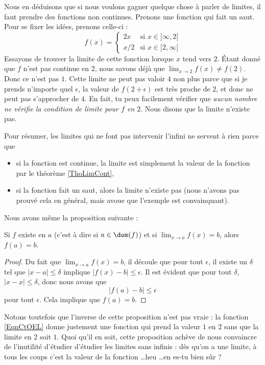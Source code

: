 Nous en déduisons que si nous voulons gagner quelque chose à parler de limites, il faut prendre des fonctions non continues. Prenons une fonction qui fait un saut. Pour se fixer les idées, prenons celle-ci :
\begin{equation}    \label{EqnCtOEL}
f(x)=
\begin{cases}
2x&\text{si $x\in]\infty,2[$}\\
x/2&\text{si $x\in[2,\infty[$}
\end{cases}
\end{equation}  
Essayons de trouver la limite de cette fonction lorsque $x$ tend vers $2$. Étant donné que $f$ n'est pas continue en $2$, nous savons déjà que $\lim_{x\to 2}f(x)\neq f(2)$. Donc ce n'est pas $1$. Cette limite ne peut pas valoir $4$ non plus parce que si je prends n'importe quel $\epsilon$, la valeur de $f(2+\epsilon)$ est très proche de $2$, et donc ne peut pas s'approcher de $4$. En fait, tu peux facilement vérifier que \emph{aucun nombre ne vérifie la condition de limite pour $f$ en $2$}. Nous disons que la limite n'existe pas.

Pour résumer, les limites qui ne font pas intervenir l'infini ne servent à rien parce que
\begin{itemize}
\item si la fonction est continue, la limite est simplement la valeur de la fonction par le théorème \ref{ThoLimCont},
\item si la fonction fait un saut, alors la limite n'existe pas (nous n'avons pas prouvé cela en général, mais avoue que l'exemple est convainquant).
\end{itemize}
Nous avons même la proposition suivante :
\begin{proposition}     \label{PropExisteLimVql}
Si $f$ existe en $a$ (c'est à dire si $a\in\dom(f)$) et si $\lim_{x\to a}f(x)=b$, alors $f(a)=b$.
\end{proposition}

\begin{proof}
Du fait que $\lim_{x\to a}f(x)=b$, il découle que pour tout $\epsilon$, il existe un $\delta$ tel que $| x-a |\leq \delta$ implique $| f(x)-b |\leq \epsilon$. Il est évident que pour tout $\delta$, $| x-x |\leq \delta$, donc nous avons que 
\[ 
  | f(a)-b |\leq\epsilon
\]
pour tout $\epsilon$. Cela implique que $f(a)=b$.
\end{proof}
Notons toutefois que l'inverse de cette proposition n'est pas vraie : la fonction \eqref{EqnCtOEL} donne justement une fonction qui prend la valeur $1$ en $2$ sans que la limite en $2$ soit $1$. Quoi qu'il en soit, cette proposition achève de nous convaincre de l'inutilité d'étudier d'étudier les limites sans infinis : dès qu'on a une limite, à tous les coups c'est la valeur de la fonction \ldots heu \ldots en es-tu bien sûr ?


